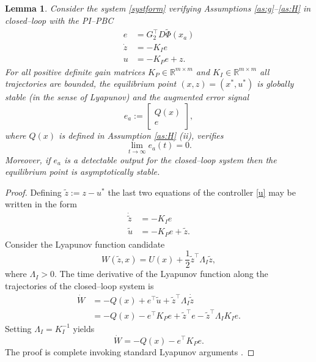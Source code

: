 \documentclass[10pt, conference]{ieeeconf}
\newtheorem{lemma}{Lemma}
\def\rea{\mathbb{R}}
\def\begequ{\begin{equation}}
\def\endequ{\end{equation}}
\def\lab{\label}
\def\lef[{\left[\begin{array}}
	\def\rig]{\end{array}\right]}
\begin{document}
\begin{lemma} 
\lab{lem2}
Consider the system \eqref{systform} verifying Assumptions \ref{as:g}--\ref{as:H} in closed--loop with the PI--PBC
\begequ
\lab{u}
\begin{aligned}
                 e&=G_2^\top D \widetilde {\Phi}(x_a)\\
                 \dot{z} &= - K_I e\\
		u &= - K_P e + z.
	\end{aligned}
\end{equation}
{\em For all} positive definite gain matrices $K_P \in \rea^{m \times m}$ and $K_I \in \rea^{m \times m}$ all trajectories are bounded, the equilibrium point $(x,z)=(x^*,u^*)$ is {\em globally stable} (in the sense of Lyapunov) and the augmented error signal
\begequ
\lab{ea}
e_a:=\lef[{c} Q(x) \\ e \rig],
\endequ
where $Q(x)$ is defined in Assumption \ref{as:H} (ii), verifies
\begequ
\lab{limea}
\lim_{t \to \infty} e_a(t)=0.
\endequ
Moreover, if $e_a$ is a detectable output for the closed--loop system then the equilibrium point is {\em asymptotically} stable.
\end{lemma}
\begin{proof}
Defining $\tilde z:=z-u^*$ the last two equations of the controller \eqref{u} may be written in the form
\begequ
\lab{u1}
\begin{aligned}
                 \dot {\tilde z} &= - K_I e\\
		\tilde u &= - K_P e + \tilde z.
	\end{aligned}
\end{equation}
Consider the Lyapunov function candidate
\begequ
\lab{w}
	W(\tilde{z},x) = U(x) + \frac{1}{2}\tilde{z}^\top \Lambda_I\tilde{z},
\endequ
where $\Lambda_I>0$. The time derivative of the Lyapunov function along the trajectories of the closed--loop system is
\begin{equation} \label{dotw}
	\begin{aligned}
		\dot{W} &= -Q(x) + e^\top \tilde{u} + \tilde{z}^\top \Lambda_I \dot{\tilde{z}} \\
		&= -Q(x) - e^\top K_P e+ \tilde{z}^\top e - \tilde{z}^\top \Lambda_I K_I e.
	\end{aligned}
\end{equation}
Setting $ \Lambda_I= K_I^{-1}$ yields
$$
\dot{W} = -Q(x) - e^\top K_P e.
$$
The proof is complete invoking standard Lyapunov arguments \cite{KHA}.
\end{proof}
\end{document}
